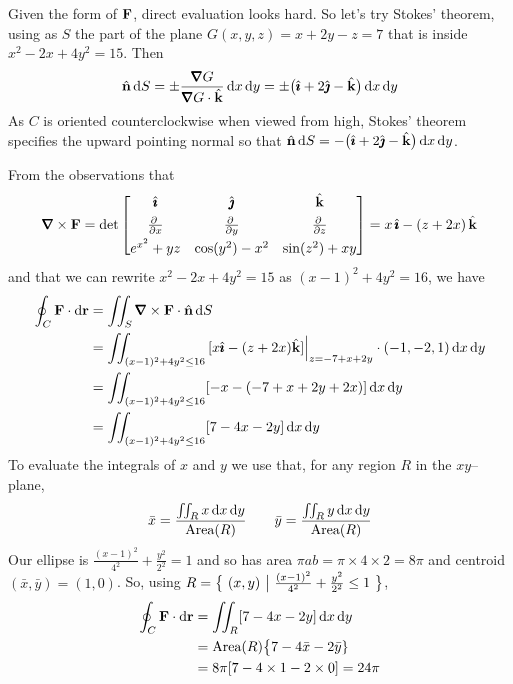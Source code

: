 \begin{solution} 
Given the form of $\mathbf{F}$, direct evaluation looks hard. So let's try
Stokes' theorem, using as $S$ the part of the plane $G(x,y,z)=x+2y-z=7$ 
that is inside $x^2-2x+4y^2=15$. Then
\begin{equation*}
\hn\,\dee{S} = \pm \frac{\vnabla G}{\vnabla G\cdot\hk}\,\dee{x}\,\dee{y}
= \pm\big(\hi+2\hj-\hk\big)\,\dee{x}\,\dee{y}
\end{equation*} 
As $C$ is oriented counterclockwise when viewed from high, Stokes'
theorem specifies the upward pointing normal so that 
$\hat{\mathbf{n}}\,\mathrm{d}S = -\big(\hat{\pmb{\imath}}+2\hat{\pmb{\jmath}}-\hat{\mathbf{k}}\big)\,\mathrm{d}x\,\mathrm{d}y$.

From the observations that 
\begin{equation*}
\vnabla\times\vF=\det\left[\begin{matrix}\hi & \hj & \hk \\[0.05in]
                  \pdiff{}{x} &
                  \pdiff{}{y} &
                  \pdiff{}{z} \\[0.05in]
                  e^{x^2}+yz & \cos(y^2)-x^2 & \sin(z^2)+xy
                  \end{matrix} \right] 
=x\,\hi-(z+2x)\,\hk
\end{equation*}
and that we can rewrite $x^2-2x+4y^2=15$ as $(x-1)^2+4y^2=16$,
we have
\begin{align*}
\oint_C\vF\cdot \dee{\vr}
&=\dblInt_S \vnabla\times\vF\cdot\hn\,\dee{S}\\
&=\dblInt_{(x-1)^2+4y^2\le 16}\,
     [x\hi-(z+2x)\hk]\Big|_{z=-7+x+2y}\cdot(-1,-2,1)\,\dee{x}\,\dee{y}\\
&=\dblInt_{(x-1)^2+4y^2\le 16} [-x-(-7+x+2y+2x)]\,\dee{x}\,\dee{y}\\
&=\dblInt_{(x-1)^2+4y^2\le 16} [7-4x-2y]\,\dee{x}\,\dee{y}
\end{align*}
To evaluate the integrals of $x$ and $y$ we use that, for any region $R$
in the $xy$--plane,
\begin{equation*}
\bar x =\frac{\iint_R x\,\mathrm{d}x\,\mathrm{d}y}{\text{Area}(R)}\qquad
\bar y =\frac{\iint_R y\,\mathrm{d}x\,\mathrm{d}y}{\text{Area}(R)}
\end{equation*}
Our ellipse is $\frac{(x-1)^2}{4^2}+\frac{y^2}{2^2}=1$ 
and so has area $\pi ab = \pi\times4\times 2=8\pi$ and centroid
$(\bar x,\bar y) = (1,0)$. So, using
$R=\big\{ \ (x,y)\ \big|\ \frac{(x-1)^2}{4^2}+\frac{y^2}{2^2}\le 1\ \big\}$, 
\begin{align*}
\oint_C\mathbf{F}\cdot \mathrm{d}\mathbf{r}
&=\iint_R [7-4x-2y]\,\mathrm{d}x\,\mathrm{d}y\\
&=\text{Area}(R) \big\{7-4\bar x-2\bar y\}\\
&=8\pi[7-4\times 1-2\times 0]=24\pi
\end{align*}
\end{solution}

